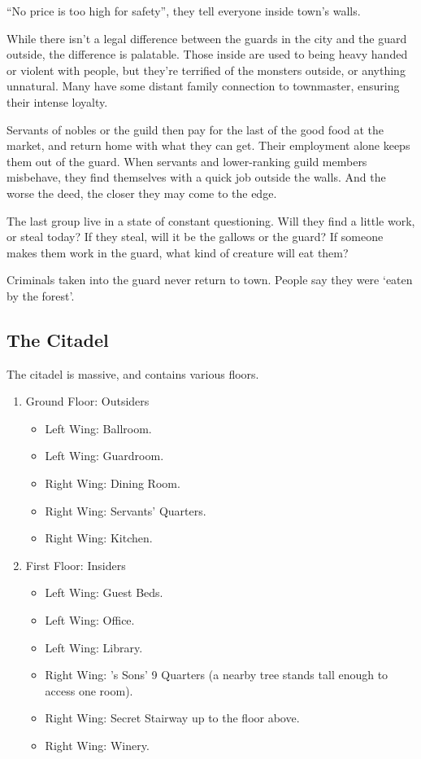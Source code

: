 \begin{multicols}{2}
``No price is too high for safety'', they tell everyone inside \gls{town}'s walls.

While there isn't a legal difference between the guards in the city and the \gls{guard} outside, the difference is palatable.
Those inside are used to being heavy handed or violent with people, but they're terrified of the monsters outside, or anything unnatural.
Many have some distant family connection to \gls{townmaster}, ensuring their intense loyalty.

Servants of nobles or the guild then pay for the last of the good food at the market, and return home with what they can get.
Their employment alone keeps them out of the \gls{guard}.
When servants and lower-ranking guild members misbehave, they find themselves with a quick job outside the walls.
And the worse the deed, the closer they may come to the \gls{edge}.

The last group live in a state of constant questioning.
Will they find a little work, or steal today?
If they steal, will it be the gallows or the guard?
If someone makes them work in the \gls{guard}, what kind of creature will eat them?

Criminals taken into the \gls{guard} never return to \gls{town}.
People say they were `eaten by the forest'.

\subsection{The Citadel}\label{citadel}

The citadel is massive, and contains various floors.

\begin{enumerate}

  \item{Ground Floor: Outsiders}
    \begin{itemize}
      \item{Left Wing: Ballroom.}
      \item
      Left Wing: Guardroom.
      \item
      Right Wing: Dining Room.
      \item
      Right Wing: Servants' Quarters.
      \item
      Right Wing: Kitchen.
    \end{itemize}
  \item{First Floor: Insiders}
    \begin{itemize}
      \item
      Left Wing: Guest Beds.
      \item
      Left Wing: Office.
      \item
      Left Wing: Library.
      \item
      Right Wing: 's Sons' 9 Quarters (a nearby tree stands tall enough to access one room).
      \item
      Right Wing: Secret Stairway up to the floor above.
      \item
      Right Wing: Winery.
    \end{itemize}


\end{enumerate}
\end{multicols}
